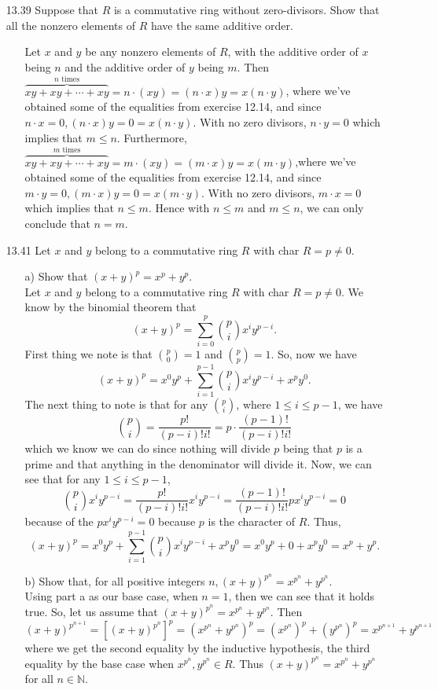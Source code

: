 \documentclass[12pt]{article}
\begin{document}
\begin{enumerate}
\item[13.39] Suppose that $R$ is a commutative ring without zero-divisors. Show that all the nonzero elements of
$R$ have the same additive order.
\begin{enumerate}
\item[] Let $x$ and $y$ be any nonzero elements of $R$, with the additive order of $x$ being $n$ and the
additive order of $y$ being $m$. Then $\overbrace{xy + xy + \cdots + xy}^{\mbox{$n$ times}} = n \cdot (xy) = (n \cdot x)y 
= x(n \cdot y)$, where we've obtained some of the equalities from exercise 12.14, and since $n \cdot x = 0, (n \cdot x)y = 0 = x(n \cdot y)$. With no zero divisors, $n \cdot y = 0$ which
implies that $m \leq n$. Furthermore, $\overbrace{xy + xy + \cdots + xy}^{\mbox{$m$ times}} = m \cdot (xy) = (m \cdot x)y 
= x(m \cdot y)$,where we've obtained some of the equalities from exercise 12.14, 
and since $m \cdot y = 0, (m \cdot x)y = 0 = x(m \cdot y)$. With no zero divisors, $m \cdot x = 0$ which
implies that $n \leq m$. Hence with $n \leq m$ and $m \leq n$, we can only conclude that $n = m$.
\end{enumerate}

\item[13.41] Let $x$ and $y$ belong to a commutative ring $R$ with char $R = p \neq 0$.
\begin{enumerate}
\item[a)] Show that $(x + y)^p = x^p + y^p$.\\
Let $x$ and $y$ belong to a commutative ring $R$ with char $R = p \neq 0$.
We know by the binomial theorem that 
\[ (x + y)^p = \sum_{i = 0}^p {p \choose i} x^iy^{p - i}.
\]
First thing we note is that ${p \choose 0} = 1$ and ${p \choose p} = 1$. So, now we have
\[ 
(x + y)^p = x^0y^p + \sum_{i = 1}^{p-1} {p \choose i} x^iy^{p - i} + x^py^0.
\] The next thing to note is that for any ${p \choose i}$, where $1 \leq i \leq p-1$, we have
\[
{p \choose i} = \frac{p!}{(p-i)!i!} = p \cdot \frac{(p-1)!}{(p-i)!i!}
\]
which we know we can do since nothing will divide $p$ being that $p$ is a prime and that anything
in the denominator will divide it. Now, we can see that for any $1 \leq i \leq p-1$, 
\[
{p \choose i}x^iy^{p-i} = \frac{p!}{(p-i)!i!}x^iy^{p-i} = \frac{(p-1)!}{(p-i)!i!}px^iy^{p-i} = 0
\]
because of the $px^iy^{p-i} = 0$ because $p$ is the character of $R$. Thus,
\[
(x + y)^p = x^0y^p + \sum_{i = 1}^{p-1} {p \choose i} x^iy^{p - i} + x^py^0 = x^0y^p + 0 + x^py^0
= x^p + y^p. 
\]
\item[b)] Show that, for all positive integers $n, (x + y)^{p^n} = x^{p^n} + y^{p^n}$.\\
Using part a as our base case, when $n = 1$, then we can see that it holds true. So, let us
assume that $(x + y)^{p^n} = x^{p^n} + y^{p^n}$.  Then
\[
(x + y)^{p^{n+1}} = [(x + y)^{p^{n}}]^p = (x^{p^n} + y^{p^n})^p = (x^{p^n})^p + (y^{p^n})^p =
x^{p^{n+1}} + y^{p^{n+1}}
\]
where we get the second equality by the inductive hypothesis, the third equality by the base case when
$x^{p^n}, y^{p^n} \in R$. Thus $(x + y)^{p^n} = x^{p^n} + y^{p^n}$ for all $n \in \mathbb{N}$.
\end{enumerate}


\end{enumerate}
\end{document}
